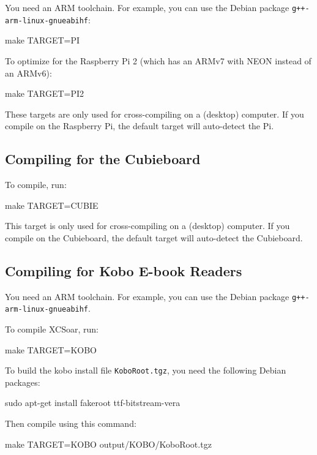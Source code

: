 You need an ARM toolchain.  For example, you can use the Debian
package \verb|g++-arm-linux-gnueabihf|:

\begin{verbatim*}
make TARGET=PI
\end{verbatim*}

To optimize for the Raspberry Pi 2 (which has an ARMv7 with NEON
instead of an ARMv6):

\begin{verbatim*}
make TARGET=PI2
\end{verbatim*}

These targets are only used for cross-compiling on a (desktop)
computer.
If you compile on the Raspberry Pi, the default target will
auto-detect the Pi.

\subsection{Compiling for the Cubieboard}

To compile, run:

\begin{verbatim*}
make TARGET=CUBIE
\end{verbatim*}

This target is only used for cross-compiling on a (desktop) computer.
If you compile on the Cubieboard, the default target will auto-detect
the Cubieboard.

\subsection{Compiling for Kobo E-book Readers}

You need an ARM toolchain.  For example, you can use the Debian
package \verb|g++-arm-linux-gnueabihf|.

To compile XCSoar, run:

\begin{verbatim*}
make TARGET=KOBO
\end{verbatim*}

To build the kobo install file \texttt{KoboRoot.tgz}, you need the
following Debian packages:

\begin{verbatim*}
sudo apt-get install fakeroot ttf-bitstream-vera
\end{verbatim*}

Then compile using this command:

\begin{verbatim*}
make TARGET=KOBO output/KOBO/KoboRoot.tgz
\end{verbatim*}

